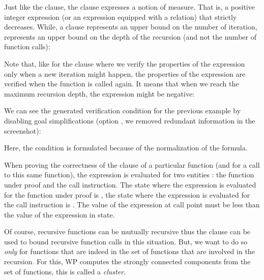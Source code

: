 

Just like the  clause, the 
clause expresses a notion of measure. That is, a positive integer expression
(or an expression equipped with a relation) that strictly decreases. While, a
 clause represents an upper bound on the number of
iteration,  represents an upper bound on the depth of the
recursion (and not the number of function calls):




Note that, like for the  clause where we verify the
properties of the expression only when a new iteration might happen, the
properties of the  expression are verified when the
function is called again. It means that when we reach the maximum recursion
depth, the expression might be negative:




We can see the generated verification condition for the previous example by
disabling goal simplifications (option , we removed
redundant information in the screenshot):



Here, the condition  is formulated
 because of the normalization of the
formula.


When proving the correctness of the  clause of a particular
function (and for a call to this same function), the expression is evaluated
for two entities : the function under proof and the call instruction. The state
where the expression is evaluated for the function under proof is
, the state where the expression is evaluated for the call
instruction is . The value of the expression at call point must
be less than the value of the expression in  state.




Of course, recursive functions can be mutually recursive thus the
 clause can be used to bound recursive function calls in
this situation. But, we want to do so {\em only} for functions that are
indeed in the set of functions that are involved in the recursion. For this, WP
computes the strongly connected components from the set of functions, this is
called a {\em cluster}.

